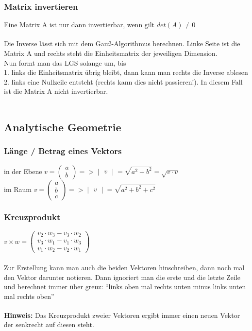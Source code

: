 \documentclass[6pt,a4paper]{scrartcl}
\begin{document}
\begin{multicols*}{3}
\subsubsection{Matrix invertieren}
Eine Matrix A ist nur dann invertierbar, wenn gilt $det(A) \neq 0$\\
\\
Die Inverse lässt sich mit dem Gauß-Algorithmus berechnen. Linke Seite ist die Matrix A und rechts steht die Einheitsmatrix der jeweiligen Dimension. \\
Nun formt man das LGS solange um, bis \\
1. links die Einheitsmatrix übrig bleibt, dann kann man rechts die Inverse ablesen \\
2. links eine Nullzeile entsteht (rechts kann dies nicht passieren!). In diesem Fall ist die Matrix A nicht invertierbar.\\
\\
\subsection{Analytische Geometrie}
\subsubsection{Länge / Betrag eines Vektors}
in der Ebene $
v = \begin{pmatrix}a \\ b\end{pmatrix} => \begin{vmatrix}v\end{vmatrix} = \sqrt{a^2 + b^2} = \sqrt{v \cdot v}
$\\
im Raum $
v = \begin{pmatrix}a \\ b \\ c\end{pmatrix} => \begin{vmatrix}v\end{vmatrix} = \sqrt{a^2 + b^2 + c^2}
$
\subsubsection{Kreuzprodukt}
$v \times w = \begin{pmatrix}
v_2 \cdot w_3 - v_3 \cdot w_2 \\
v_3 \cdot w_1 - v_1 \cdot w_3 \\
v_1 \cdot w_2 - v_2 \cdot w_1
\end{pmatrix}$
\\
\\
Zur Erstellung kann man auch die beiden Vektoren hinschreiben, dann noch mal den Vektor darunter notieren. Dann ignoriert man die erste und die letzte Zeile und berechnet immer über greuz: ``links oben mal rechts unten minus links unten mal rechts oben''\\
\\
\textbf{Hinweis:} Das Kreuzprodukt zweier Vektoren ergibt immer einen neuen Vektor der senkrecht auf diesen steht.\\

\end{multicols*}
\end{document}
